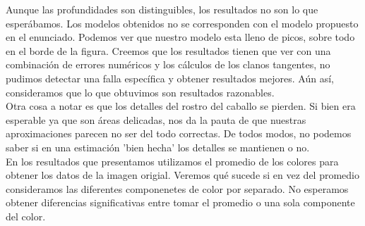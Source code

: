
Aunque las profundidades son distinguibles, los resultados no son lo que esperábamos. Los modelos obtenidos no se corresponden con el modelo propuesto en el enunciado. Podemos ver que nuestro modelo esta lleno de picos, sobre todo en el borde de la figura. Creemos que los resultados tienen que ver con una combinación de errores numéricos y los cálculos de los clanos tangentes, no pudimos detectar una falla específica y obtener resultados mejores. Aún así, consideramos que lo que obtuvimos son resultados razonables. \\




Otra cosa a notar es que los detalles del rostro del caballo se pierden. Si bien era esperable ya que son áreas delicadas, nos da la pauta de que nuestras aproximaciones parecen no ser del todo correctas. De todos modos, no podemos saber si en una estimación 'bien hecha' los detalles se mantienen o no. \\


En los resultados que presentamos utilizamos el promedio de los colores para obtener los datos de la imagen origial. Veremos qué sucede si en vez del promedio consideramos las diferentes componenetes de color por separado. No esperamos obtener diferencias significativas entre tomar el promedio o una sola componente del color.

